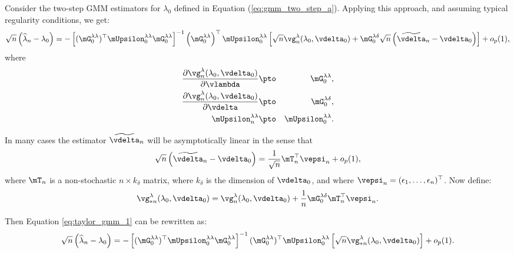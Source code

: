 \documentclass[english,12pt]{book}\usepackage[]{graphicx}\usepackage[]{xcolor}
\begin{document}
Consider the two-step GMM estimators for $\lambda_0$ defined in Equation (\ref{eq:gmm_two_step_a}). Applying this approach, and assuming typical regularity conditions, we get:
\begin{equation}\label{eq:taylor_gmm_1}
\sqrt{n}\left(\widehat{\lambda}_n - \lambda_0\right) = - \left[(\mG_0^{\lambda\lambda})^\top\mUpsilon_0^{\lambda\lambda}\mG_0^{\lambda\lambda}\right]^{-1}\left(\mG_0^{\lambda\lambda}\right)^\top\mUpsilon_0^{\lambda\lambda}\left[\sqrt{n}\vg_n^{\lambda}(\lambda_0, \vdelta_0) + \mG_0^{\lambda\delta}\sqrt{n}\left(\widetilde{\vdelta}_n - \vdelta_0\right)\right] + o_p(1),
\end{equation}
%
where
\begin{eqnarray*}
	\frac{\partial \vg_n^{\lambda}(\lambda_0, \vdelta_0)}{\partial \vlambda} &\pto&  \mG^{\lambda\lambda}_0, \\
	\frac{\partial \vg_n^{\lambda}(\lambda_0, \vdelta_0)}{\partial \vdelta} &\pto&  \mG^{\lambda\delta}_0, \\
	\mUpsilon^{\lambda\lambda}_n & \pto & \mUpsilon^{\lambda\lambda}_0.
\end{eqnarray*}

In many cases the estimator $\widetilde{\vdelta}_n$ will be asymptotically linear in the sense that
\begin{equation*}
\sqrt{n}\left(\widetilde{\vdelta}_n - \vdelta_0\right)=\frac{1}{\sqrt{n}}\mT_n^\top\vepsi_n + o_p(1),
\end{equation*}
%
where $\mT_n$ is a non-stochastic $n\times k_{\delta}$ matrix, where $k_{\delta}$ is the dimension of $\vdelta_0$, and where $\vepsi_n = (\epsilon_1,\ldots,\epsilon_n)^\top$. Now define:
\begin{equation*}
\vg_{*n}^{\lambda}(\lambda_0, \vdelta_0) = \vg_n^{\lambda}(\lambda_0, \vdelta_0) + \frac{1}{n}\mG^{\lambda\delta}_0\mT_n^\top\vepsi_n.
\end{equation*}

Then Equation \eqref{eq:taylor_gmm_1} can be rewritten as:
\begin{equation}\label{eq:taylor_gmm_2}
\sqrt{n}\left(\widehat{\lambda}_n - \lambda_0\right) = - \left[(\mG^{\lambda\lambda}_0)^\top\mUpsilon^{\lambda\lambda}_0\mG^{\lambda\lambda}_0\right]^{-1}(\mG^{\lambda\lambda}_0)^\top\mUpsilon^{\lambda\lambda}_0\left[\sqrt{n}\vg_{*n}^{\lambda}(\lambda_0, \vdelta_0) \right] + o_p(1).
\end{equation}
\end{document}
